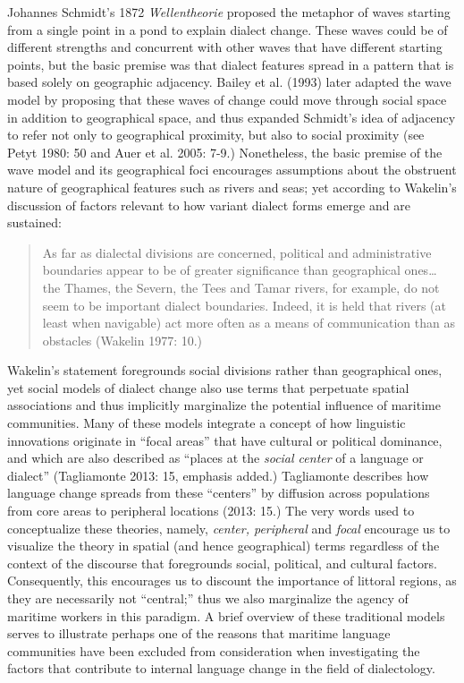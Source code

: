 \begin{styleStandard}
Johannes Schmidt’s 1872 \textit{Wellentheorie} proposed the metaphor of waves starting from a single point in a pond to explain dialect change. These waves could be of different strengths and concurrent with other waves that have different starting points, but the basic premise was that dialect features spread in a pattern that is based solely on geographic adjacency. Bailey et al. (1993) later adapted the wave model by proposing that these waves of change could move through social space in addition to geographical space, and thus expanded Schmidt’s idea of adjacency to refer not only to geographical proximity, but also to social proximity (see Petyt 1980: 50 and Auer et al. 2005: 7-9.) Nonetheless, the basic premise of the wave model and its geographical foci encourages assumptions about the obstruent nature of geographical features such as rivers and seas; yet according to Wakelin’s discussion of factors relevant to how variant dialect forms emerge and are sustained: 
\end{styleStandard}


\begin{quotation}
As far as dialectal divisions are concerned, political and administrative boundaries appear to be of greater significance than geographical ones… the Thames, the Severn, the Tees and Tamar rivers, for example, do not seem to be important dialect boundaries. Indeed, it is held that rivers (at least when navigable) act more often as a means of communication than as obstacles (Wakelin 1977: 10.)

\end{quotation}
\begin{styleStandard}
Wakelin’s statement foregrounds social divisions rather than geographical ones, yet social models of dialect change also use terms that perpetuate spatial associations and thus implicitly marginalize the potential influence of maritime communities. Many of these models integrate a concept of how linguistic innovations originate in “focal areas” that have cultural or political dominance, and which are also described as “places at the \textit{social center} of a language or dialect” (Tagliamonte 2013: 15, emphasis added.) Tagliamonte describes how language change spreads from these “centers” by diffusion across populations from core areas to peripheral locations (2013: 15.) The very words used to conceptualize these theories, namely, \textit{center, peripheral }and\textit{ focal} encourage us to visualize the theory in spatial (and hence geographical) terms regardless of the context of the discourse that foregrounds social, political, and cultural factors. Consequently, this encourages us to discount the importance of littoral regions, as they are necessarily not “central;” thus we also marginalize the agency of maritime workers in this paradigm. A brief overview of these traditional models serves to illustrate perhaps one of the reasons that maritime language communities have been excluded from consideration when investigating the factors that contribute to internal language change in the field of dialectology. 
\end{styleStandard}


